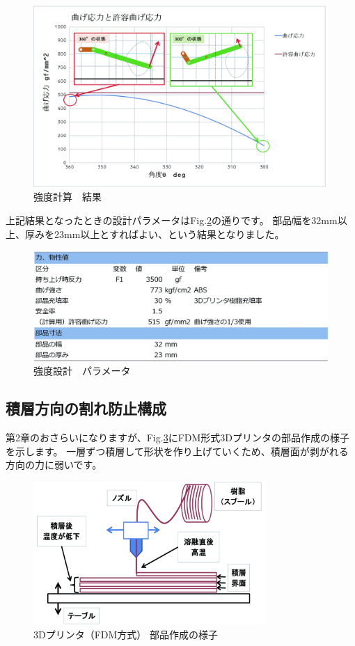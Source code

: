 \begin{figure}[htbp]
\centering
\includegraphics[width=380pt]{fig/fig09_cmyk.jpg}
\caption{強度計算　結果}
\label{fig09}
\end{figure}

上記結果となったときの設計パラメータはFig.\ref{fig10}の通りです。
部品幅を32mm以上、厚みを23mm以上とすればよい、という結果となりました。

\begin{figure}[htbp]
\centering
\includegraphics[width=350pt]{fig/fig10_cmyk.jpg}
\caption{強度設計　パラメータ}
\label{fig10}
\end{figure}

\clearpage

\subsection{積層方向の割れ防止構成}\label{ux7a4dux5c64ux65b9ux5411ux306eux5272ux308cux9632ux6b62ux69cbux6210}

第2章のおさらいになりますが、Fig.\ref{fig12}にFDM形式3Dプリンタの部品作成の様子を示します。
一層ずつ積層して形状を作り上げていくため、積層面が剥がれる方向の力に弱いです。

\begin{figure}[htbp]
\centering
\includegraphics[width=250pt]{fig/fig12_cmyk.jpg}
\caption{3Dプリンタ（FDM方式） 部品作成の様子}
\label{fig12}
\end{figure}

